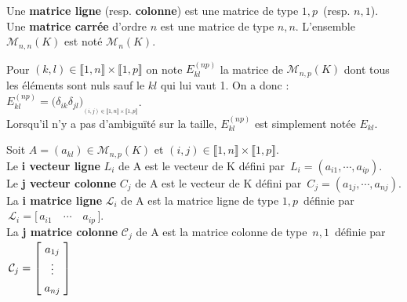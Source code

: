 \noindent Une \textbf{matrice ligne} (resp. \textbf{colonne}) est une matrice de type $1,p\,$ (resp. $n,1$).\\
Une \textbf{matrice carrée} d'ordre $n$ est une matrice de type $n,n$. L'ensemble \(\mathcal{M}_{n,n}(K)\) est noté \(\mathcal{M}_n(K)\).

\vspace{1cm}

\noindent Pour \((k,l)\in \llbracket 1,n \rrbracket \times \llbracket 1,p \rrbracket \) on note \(E_{kl}^{(np)}\) la matrice de \(\mathcal{M}_{n,p}(K)\) dont tous les éléments sont nuls sauf le $kl$ qui lui vaut 1. On a donc : \(E_{kl}^{(np)}=\bigl(\delta_{ik}\delta_{jl}\bigr)_{_{(i,j)\in \llbracket 1,n \rrbracket \times \llbracket 1,p \rrbracket}}\).\vspace{0.1cm}\\
Lorsqu'il n'y a pas d'ambiguïté sur la taille, \(E_{kl}^{(np)}\) est simplement notée \(E_{kl}\).

\vspace{1.5cm}

Soit \(A=(a_{kl})\in\mathcal{M}_{n,p}(K)\) et \((i,j)\in \llbracket 1,n \rrbracket \times \llbracket 1,p \rrbracket\).\vspace{0.3cm}\\
Le \textbf{i vecteur ligne} \(L_i\) de A est le vecteur de K défini par \(\,L_i=(a_{i1},\cdots,a_{ip}).\)\vspace{0.1cm}\\ 
Le \textbf{j vecteur colonne} \(C_j\) de A est le vecteur de K défini par \(\,C_j=(a_{1j},\cdots,a_{nj}).\)\vspace{0.1cm}\\
La \textbf{i matrice ligne} \(\mathcal{L} _i\) de A est la matrice ligne de type $1,p\,$ définie par \(\, \mathcal{L} _i= \bigl[\, a_{i1} \quad \cdots \quad a_{ip}\, \bigr]\).\vspace{0.1cm}\\
La \textbf{j matrice colonne} \(\mathcal{C} _j\) de A est la matrice colonne de type $\,n,1\,$ définie par \(\, \displaystyle \arraycolsep=0.1cm\def\arraystretch{1.3} \mathcal{C} _j=\left[
\begin{array}{c}
    a_{1j} \\
    \vdots \\
    a_{nj}
\end{array} \right]\)

